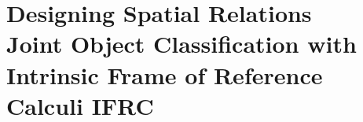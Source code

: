 \chapter[]{Designing Spatial Relations\\ {\Large Joint Object Classification with Intrinsic Frame of Reference Calculi IFRC}}
\label{chap:ifrc}


